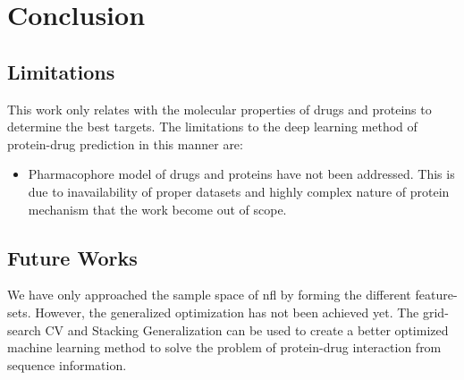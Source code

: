 \chapter{Conclusion}

\section{Limitations}
This work only relates with the molecular properties of drugs and proteins to determine the best targets. The limitations to the deep learning method of protein-drug prediction in this manner are:
\begin{itemize}
    \item Pharmacophore model of drugs and proteins have not been addressed. This is due to inavailability of proper datasets and highly complex nature of protein mechanism that the work become out of scope.
\end{itemize}

\section{Future Works}
We have only approached the sample space of \acrfull{nfl} by forming the different feature-sets. However, the generalized optimization has not been achieved yet. The grid-search CV and Stacking Generalization can be used to create a better optimized machine learning method to solve the problem of protein-drug interaction from sequence information.

\iffalse
\section{Future Work}
The future works can be listed as below:
\begin{itemize}
    \item The molecular dockings of drugs with proteins should be analysed using the contact maps of proteins to properly.
    \item The pharmacological model to identify safe drugs for treating diseases need to assessed.
    \item Molecular dynamics should be related to drugs factor when determining the druggability of proteins.
\end{itemize}
\fi

